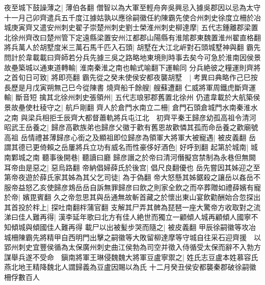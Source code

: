 夜至城下鼓譟薄之|{
	薄伯各翻}
僧智以為大軍至輕舟奔吳興忌入據吳郡因以忌為太守十一月己卯齊遣兵五千度江據姑孰以應徐嗣徽任約陳霸先使合州刺史徐度立柵於冶城庚寅齊又遣安州刺史翟子崇楚州刺史劉士榮淮州刺史柳達摩|{
	五代志鍾離郡梁置北徐州齊改曰楚州管下定遠縣梁置安州江都郡山陽縣有淮隂郡東魏置淮州翟直格翻}
將兵萬人於胡墅度米三萬石馬千匹入石頭|{
	胡墅在大江北㟁對石頭城墅神與翻}
霸先問計於韋載載曰齊師若分兵先據三吳之路略地東境則時事去矣今可急於淮南因侯景故壘築城以通東道轉輸|{
	淮南秦淮之南也輸式喻翻下運輸同}
分兵絶彼之糧運則齊將之首旬日可致|{
	將即亮翻}
霸先從之癸未使侯安都夜襲胡墅　|{
	考異曰典略作己巳按長歷是月戊寅朔無己巳今從陳書}
燒齊船千餘艘|{
	艘蘇遭翻}
仁威將軍周鐵虎斷齊運輸|{
	斷音短}
擒其北徐州刺史張領州|{
	五代志琅邪郡舊置北徐州}
仍遣韋載於大航築侯景故壘使杜稜守之|{
	航戶剛翻}
齊人於倉門水南立二柵|{
	倉門石頭倉城門水南秦淮水之南}
與梁兵相拒壬辰齊大都督蕭軌將兵屯江北　初齊平秦王歸彦幼孤高祖令清河昭武王岳養之|{
	歸彦高歡族弟也歸彦父徽于歡有舊恩故歡憐其孤而命岳養之歡廟號高祖}
岳情禮甚薄歸彦心銜之及顯祖即位歸彦為領軍大將軍大被寵遇|{
	被皮義翻}
岳謂其德已更倚賴之岳屢將兵立功有威名而性豪侈好酒色|{
	好呼到翻}
起第於城南|{
	城南鄴城之南}
聽事後開巷|{
	聽讀曰廳}
歸彦譖之於帝曰清河僭擬宫禁制為永巷但無闕耳帝由是惡之|{
	惡烏路翻}
帝納倡婦薛氏於後宫|{
	倡尺良翻優也}
岳先嘗因其姊迎之至第帝夜遊於薛氏家其姊為其父乞司徒|{
	為于偽翻}
帝大怒懸其姊鋸殺之讓岳以姦岳不服帝益怒乙亥使歸彦鴆岳岳自訴無罪歸彦曰飲之則家全飲之而卒葬贈如禮薛嬪有寵於帝|{
	嬪毘賓翻}
久之帝忽思其與岳通無故斬首藏之於懷出東山宴飲勸酬始合忽探出其首投於柈上|{
	探吐南翻柈蒲官翻}
支解其尸弄其髀為琵琶一座大驚帝方收取對之流涕曰佳人難再得|{
	漢李延年歌曰北方有佳人絶世而獨立一顧傾人城再顧傾人國寧不知傾城與傾國佳人難再得}
載尸以出被髪步哭而隨之|{
	被皮義翻}
甲辰徐嗣徽等攻冶城柵陳霸先將精甲自西明門出擊之嗣徽等大敗留柳達摩等守城自往采石迎齊援　以郢州刺史宜豐侯循為太保廣州刺史曲江侯勃為司空并徵入侍循受太保而辭不入勃方謀舉兵遂不受命　鎭南將軍王琳侵魏魏大將軍豆盧寧禦之|{
	姓氏志豆盧本姓慕容氏燕北地王精降魏北人謂歸義為豆盧因賜以為氏}
十二月癸丑侯安都襲秦郡破徐嗣徽柵俘數百人

